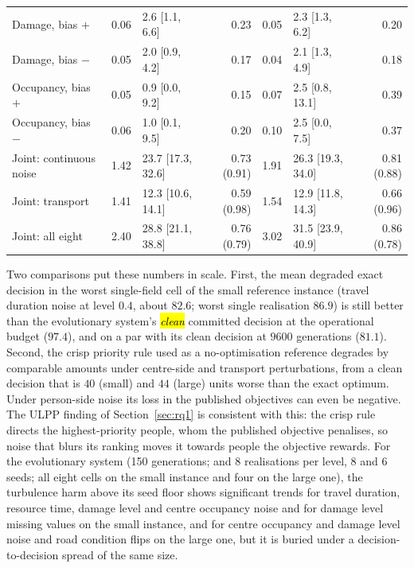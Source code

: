 \documentclass[systems,article,accept,moreauthors,pdftex]{Definitions/mdpi}
\begin{document}
\begin{table}[H]
\begin{tabularx}{\textwidth}{Lrlrrlr}
Damage, bias $+$ & 0.06 & 2.6 [1.1, 6.6] & 0.23 & 0.05 & 2.3 [1.3, 6.2] & 0.20\\
Damage, bias $-$ & 0.05 & 2.0 [0.9, 4.2] & 0.17 & 0.04 & 2.1 [1.3, 4.9] & 0.18\\
Occupancy, bias $+$ & 0.05 & 0.9 [0.0, 9.2] & 0.15 & 0.07 & 2.5 [0.8, 13.1] & 0.39\\
Occupancy, bias $-$ & 0.06 & 1.0 [0.1, 9.5] & 0.20 & 0.10 & 2.5 [0.0, 7.5] & 0.37\\
\midrule
Joint: continuous noise & 1.42 & 23.7 [17.3, 32.6] & 0.73 (0.91) & 1.91 & 26.3 [19.3, 34.0] & 0.81 (0.88)\\
Joint: transport & 1.41 & 12.3 [10.6, 14.1] & 0.59 (0.98) & 1.54 & 12.9 [11.8, 14.3] & 0.66 (0.96)\\
Joint: all eight & 2.40 & 28.8 [21.1, 38.8] & 0.76 (0.79) & 3.02 & 31.5 [23.9, 40.9] & 0.86 (0.78)\\
\bottomrule
\end{tabularx}
\end{table}

Two comparisons put these numbers in scale. First, the mean degraded exact decision in the worst
single-field cell of the small reference instance (travel duration noise at level $0.4$, about
$82.6$; worst single realisation $86.9$) is still better than the evolutionary system's
\emph{\hl{clean}%
} committed decision at the operational budget ($97.4$), and on a par with its clean
decision at $9600$ generations ($81.1$). Second, the crisp priority rule used as a
no-optimisation reference degrades by comparable amounts under centre-side and transport
perturbations, from a clean decision that is $40$ (small) and $44$ (large) units worse than the
exact optimum. Under person-side noise its loss in the published objectives can even be negative. The ULPP
finding of Section~\ref{sec:rq1} is consistent with this: the crisp rule directs the
highest-priority people, whom the published objective penalises, so noise that blurs its ranking
moves it towards people the objective rewards. For the evolutionary system (150 generations;  and 8
realisations per level, 8 and 6 seeds; all eight cells on the small instance and four on the
large one), the turbulence harm above its seed floor shows significant trends for travel duration,
resource time, damage level and centre occupancy noise and for damage level missing values on the
small instance, and for centre occupancy and damage level noise and road condition flips on the
large one, but it is buried under a decision-to-decision spread of the same size.
\end{document}
